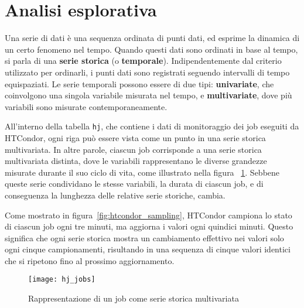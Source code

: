 \label{chap:analisi}

\section{Analisi esplorativa}

\begin{definition}
    Una serie di dati è una sequenza ordinata di punti dati, ed esprime la
    dinamica di un certo fenomeno nel tempo. Quando questi dati sono ordinati
    in base al tempo, si parla di una \textbf{serie storica} (o
    \textbf{temporale}).
    Indipendentemente dal criterio utilizzato per ordinarli, i punti dati sono
    registrati seguendo intervalli di tempo equispaziati. Le serie temporali
    possono essere di due tipi: \textbf{univariate}, che coinvolgono una
    singola variabile misurata nel tempo, e \textbf{multivariate}, dove più
    variabili sono misurate contemporaneamente.
\end{definition}

All'interno della tabella \texttt{hj}, che contiene i dati di monitoraggio dei
job eseguiti da HTCondor, ogni riga può essere vista come un punto in una
serie storica multivariata. In altre parole, ciascun job corrisponde a una
serie storica multivariata distinta, dove le variabili rappresentano le
diverse grandezze misurate durante il suo ciclo di vita, come illustrato nella
figura~ \ref{fig:job_time_series}. Sebbene queste serie condividano le stesse
variabili, la durata di ciascun job, e di conseguenza la lunghezza delle
relative serie storiche, cambia.

Come mostrato in figura~\ref{fig:htcondor_sampling}, HTCondor campiona lo
stato di ciascun job ogni tre minuti, ma aggiorna i valori ogni quindici
minuti. Questo significa che ogni serie storica mostra un cambiamento
effettivo nei valori solo ogni cinque campionamenti, risultando in una
sequenza di cinque valori identici che si ripetono fino al prossimo
aggiornamento.

\begin{figure}[p]
    \centering 
    \texttt{[image: hj\_jobs]}
    \caption{\small Rappresentazione di un job come serie storica multivariata}
    \label{fig:job_time_series}
\end{figure}

